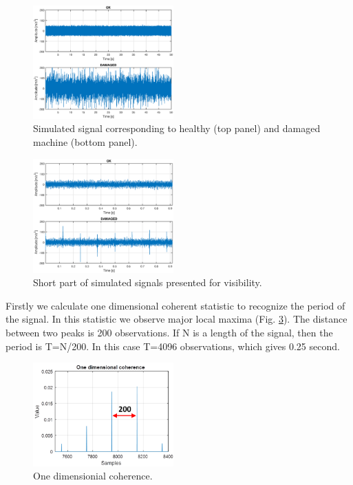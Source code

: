 \documentclass[preprint]{elsarticle}
\begin{document}
\begin{figure}[ht!]
\centering
\includegraphics[width=0.48\textwidth]{wykresy/simulated_signal_all.eps}
\caption{Simulated signal corresponding to healthy (top panel) and damaged machine (bottom panel).}
\label{fig:simulated_signal_all}
\end{figure}

\begin{figure}[ht!]
\centering
\includegraphics[width=0.48\textwidth]{wykresy/simulated_signal_part.eps}
\caption{Short part of simulated signals presented for visibility.}
\label{fig:simulated_signal_part}
\end{figure}

Firstly we calculate one dimensional coherent statistic to recognize the period of the signal. In this statistic we observe major local maxima (Fig. \ref{fig:simulated_signal_coherence}). The distance between two peaks is 200 observations. If N is a length of the signal, then the period is T=N/200. In this case T=4096 observations, which gives 0.25 second.

\begin{figure}[ht!]
\centering
\includegraphics[width=0.48\textwidth]{wykresy/simulated_coherence.png}
\caption{One dimensionial coherence.}
\label{fig:simulated_signal_coherence}
\end{figure}
\end{document}
